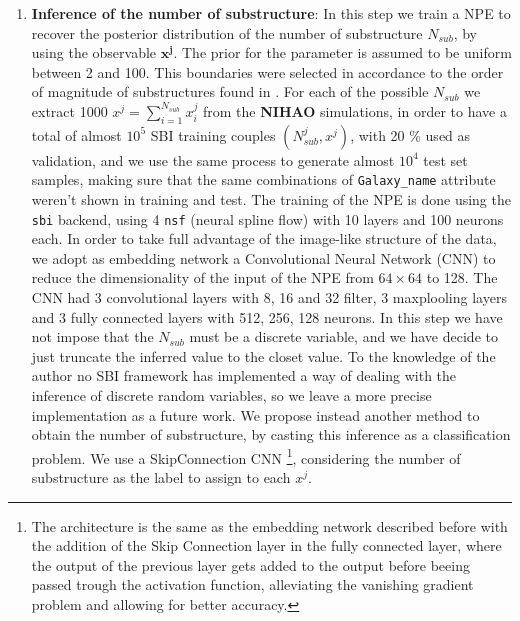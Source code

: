\begin{enumerate}
    \item \textbf{Inference of the number of substructure}: In this step we train a NPE to recover the posterior distribution of the number of substructure $N_{sub}$, by using the observable \textbf{$\mathbf{x^j}$}. The prior for the parameter is assumed to be uniform between 2 and 100. This boundaries were selected in accordance to the order of magnitude of substructures found in \cite{deasonUnravellingMassSpectrum2023}. For each of the possible $N_{sub}$ we extract 1000  $x^j = \sum_{i=1}^{N_{sub}} x_i^j$ from the \textbf{NIHAO} simulations, in order to have a total of almost $ 10^5$ SBI training couples $(N_{sub}^j, x^j)$, with 20 \% used as validation, and we use the same process to generate almost $10^4$ test set samples, making sure that the same combinations of \texttt{Galaxy\_name} attribute weren't shown in training and test. The training of the NPE is done using the \texttt{sbi} backend, using 4 \texttt{nsf} (neural spline flow) with 10 layers and 100 neurons each. In order to take full advantage of the image-like structure of the data, we adopt as embedding network a Convolutional Neural Network (CNN) to reduce the dimensionality of the input of the NPE from $64 \times 64$ to 128. The CNN had 3 convolutional layers with 8, 16 and 32 filter, 3 maxplooling layers and 3 fully connected layers with 512, 256, 128 neurons.
    In this step we have not impose that the $N_{sub}$ must be a discrete variable, and we have decide to just truncate the inferred value to the closet value. To the knowledge of the author no SBI framework has implemented a way of dealing with the inference of discrete random variables, so we leave a more precise implementation as a future work. We propose instead another method to obtain the number of substructure, by casting this inference as a classification problem. We use a SkipConnection CNN \footnote{The architecture is the same as the embedding network described before with the addition of the Skip Connection layer in the fully connected layer, where the output of the previous layer gets added to the output before beeing passed trough the activation function, alleviating the vanishing gradient problem and allowing for better accuracy.}, considering the number of substructure as the label to assign to each $x^j$.


\end{enumerate}

